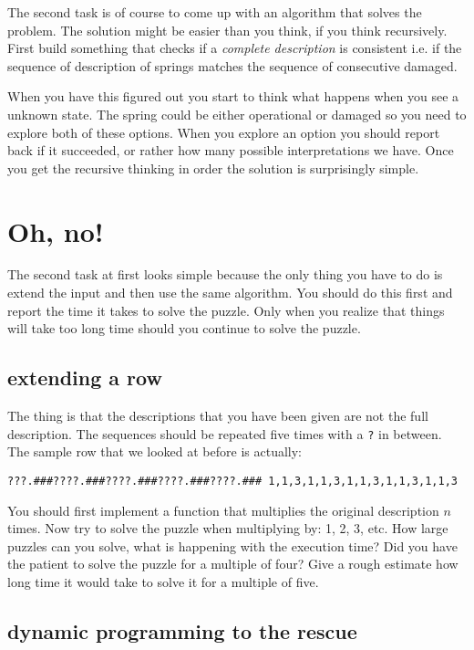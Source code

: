 \documentclass[a4paper,11pt]{article}
\begin{document}
The second task is of course to come up with an algorithm that solves
the problem. The solution might be easier than you think, if you think
recursively. First build something that checks if a {\em complete
  description} is consistent i.e. if the sequence of description of
springs matches the sequence of consecutive damaged.

When you have this figured out you start to think what happens when
you see a unknown state. The spring could be either operational or
damaged so you need to explore both of these options. When you explore
an option you should report back if it succeeded, or rather how many
possible interpretations we have. Once you get the recursive thinking
in order the solution is surprisingly simple. 

\section{Oh, no!}

The second task at first looks simple because the only thing you have
to do is extend the input and then use the same algorithm. You should
do this first and report the time it takes to solve the puzzle. Only
when you realize that things will take too long time should you
continue to solve the puzzle. 

\subsection{extending a row}

The thing is that the descriptions that you have been given are not the
full description. The sequences should be repeated five times with a
{\tt ?} in between. The sample row that we looked at before is
actually:

\begin{verbatim}
???.###????.###????.###????.###????.### 1,1,3,1,1,3,1,1,3,1,1,3,1,1,3
\end{verbatim}

You should first implement a function that multiplies the original
description $n$ times. Now try to solve the puzzle when multiplying
by: 1, 2, 3, etc. How large puzzles can you solve, what is happening
with the execution time? Did you have the patient to solve the puzzle
for a multiple of four? Give a rough estimate how long time it would
take to solve it for a multiple of five.

\subsection{dynamic programming to the rescue}
\end{document}
